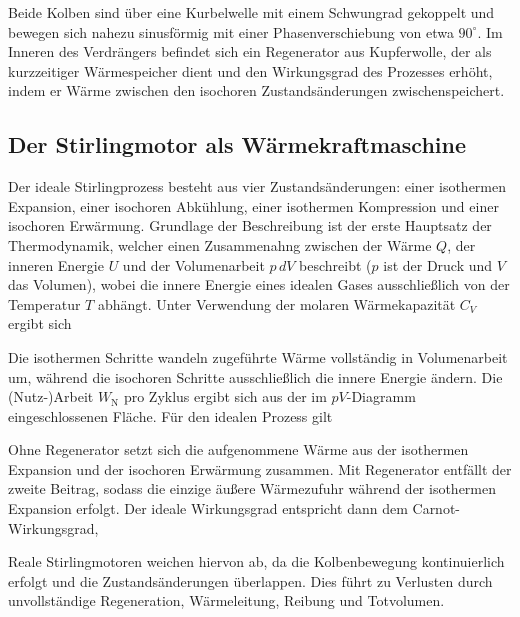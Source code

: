 Beide Kolben sind über eine Kurbelwelle mit einem Schwungrad gekoppelt und bewegen sich nahezu sinusförmig mit einer Phasenverschiebung von etwa \(90^\circ\). Im Inneren des Verdrängers befindet sich ein Regenerator aus Kupferwolle, der als kurzzeitiger Wärmespeicher dient und den Wirkungsgrad des Prozesses erhöht, indem er Wärme zwischen den isochoren Zustandsänderungen zwischenspeichert.

\subsection{Der Stirlingmotor als Wärmekraftmaschine} \label{ssec:SterWa}

Der ideale Stirlingprozess besteht aus vier Zustandsänderungen: einer isothermen Expansion, einer isochoren Abkühlung, einer isothermen Kompression und einer isochoren Erwärmung. Grundlage der Beschreibung ist der erste Hauptsatz der Thermodynamik, welcher einen Zusammenahng zwischen der Wärme $Q$, der inneren Energie $U$ und der Volumenarbeit $p \, dV$ beschreibt ($p$ ist der Druck und $V$ das Volumen),
wobei die innere Energie eines idealen Gases ausschließlich von der Temperatur $T$ abhängt. Unter Verwendung der molaren Wärmekapazität \(C_V\) ergibt sich

Die isothermen Schritte wandeln zugeführte Wärme vollständig in Volumenarbeit um, während die isochoren Schritte ausschließlich die innere Energie  ändern. Die (Nutz-)Arbeit $W_\text{N}$ pro Zyklus ergibt sich aus der im \(pV\)-Diagramm eingeschlossenen Fläche. Für den idealen Prozess gilt

Ohne Regenerator setzt sich die aufgenommene Wärme aus der isothermen Expansion und der isochoren Erwärmung zusammen. Mit Regenerator entfällt der zweite Beitrag, sodass die einzige äußere Wärmezufuhr während der isothermen Expansion erfolgt. Der ideale Wirkungsgrad entspricht dann dem Carnot-Wirkungsgrad,

Reale Stirlingmotoren weichen hiervon ab, da die Kolbenbewegung kontinuierlich erfolgt und die Zustandsänderungen überlappen. Dies führt zu Verlusten durch unvollständige Regeneration, Wärmeleitung, Reibung und Totvolumen.



